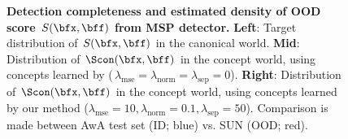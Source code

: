 \begin{figure}[h]
\centering
{} 
\caption{\textbf{Detection completeness and estimated density of OOD score $S(\bfx, \bff)$ from MSP detector.}
\textbf{Left}: Target distribution of $S(\bfx, \bff)$ in the canonical world. 
\textbf{Mid}: Distribution of $\Scon(\bfx, \bff)$ in the concept world, using concepts learned by \citep{yeh2020completeness} ($\,\lambda_\textrm{mse} = \lambda_\textrm{norm} = \lambda_\textrm{sep} = 0$).
\textbf{Right}: Distribution of $\Scon(\bfx, \bff)$ in the concept world, using concepts learned by our method ($\lambda_\textrm{mse} = 10, \lambda_\textrm{norm} = 0.1, \lambda_\textrm{sep} = 50$). Comparison is made between AwA test set (ID; blue) vs. SUN (OOD; red).}
\label{fig:score-distribution-msp}
\end{figure}
\fi



